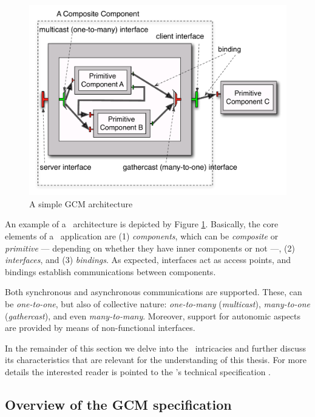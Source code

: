 						
		\begin{figure}[H]
		\centering
	   \includegraphics[scale=0.5]{figures/chapter2/gcm.pdf} 	
   		\caption{A simple GCM architecture}
   		\label{fig:gcm}
		\end{figure}
	
		
	An example of a \gcm\ architecture is depicted by Figure \ref{fig:gcm}. Basically, the core elements
	of a \gcm\ application are (1) \textit{components}, which can be \textit{composite} or \textit{primitive} 
	---	depending on whether they have inner components or not ---, (2) \textit{interfaces}, and (3) \textit{bindings}.
	As expected, interfaces act as	access points, and bindings establish communications
	between components.
	
	Both synchronous and asynchronous communications are supported. These, can be \textit{one-to-one},
	but also of collective nature: \textit{one-to-many} (\textit{multicast}), 
	\textit{many-to-one} (\textit{gathercast}), and even \textit{many-to-many}. Moreover, support for 
	autonomic aspects are provided by means of non-functional interfaces.
	
	In the remainder of this section we delve into the \gcm\ intricacies and	
	further discuss its characteristics that are relevant for the understanding of this thesis.
	For more details the interested reader 
	is pointed to the \gcm's technical specification \cite{ETSI2010:GCM}.
	
		
	
\subsection{Overview of the GCM specification}
\label{sub:gcmspec}	
	
